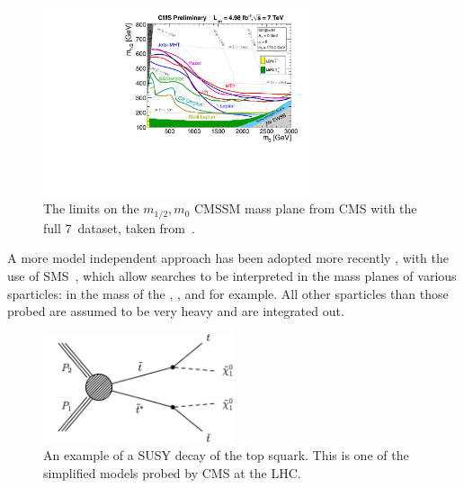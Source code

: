  \begin{figure}[htbp]
   \begin{center}
   \includegraphics[width=0.7\textwidth]{Figures/theory/CMS_SUSY_2011Limits5fb_tanb10.pdf}
   \caption{The limits on the $m_{1/2}, m_{0}$ \ac{CMSSM} mass plane from \ac{CMS} with the full 7~\TeV dataset, taken from~\cite{tw:CMSSMlimits7TeV}.}
   \label{fig:cmssmlimits}
   \end{center}
 \end{figure}

A more model independent approach has been adopted more recently , with the use of \ac{SMS}~\cite{SMS1,SMS2,SMS3, SMSPaper}, which allow searches to be interpreted in the mass planes of various sparticles: in the mass of the \sTop{}, \sbottom, \squark and \chiOneZero for example.
All other sparticles than those probed are assumed to be very heavy and are integrated out.

\begin{figure}[htbp]
  \begin{center}
  \includegraphics[width=0.5\textwidth]{Figures/theory/T2tt.png}
  \caption{An example of a \ac{SUSY} decay of the top squark. This is one of the simplified models probed by \ac{CMS} at the \ac{LHC}.}
  \label{fig:t2tt}
  \end{center}
\end{figure}


